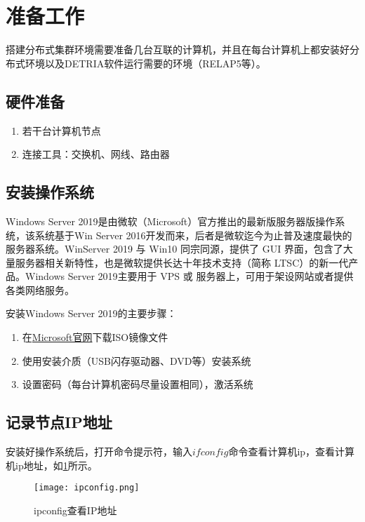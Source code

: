 \section{准备工作}

搭建分布式集群环境需要准备几台互联的计算机，并且在每台计算机上都安装好分布式环境以及DETRIA软件运行需要的环境（RELAP5等）。

\subsection{硬件准备}
\begin{enumerate}
    \item 若干台计算机节点
    \item 连接工具：交换机、网线、路由器
\end{enumerate}

\subsection{安装操作系统}
Windows Server 2019是由微软（Microsoft）官方推出的最新版服务器版操作系统，该系统基于Win Server 2016开发而来，后者是微软迄今为止普及速度最快的服务器系统。WinServer 2019 与 Win10 同宗同源，提供了 GUI 界面，包含了大量服务器相关新特性，也是微软提供长达十年技术支持（简称 LTSC）的新一代产品。Windows Server 2019主要用于 VPS 或 服务器上，可用于架设网站或者提供各类网络服务。

安装Windows Server 2019的主要步骤：
\begin{enumerate}
    \item 在\href{https://www.microsoft.com/en-us/evalcenter/evaluate-windows-server-2019}{Microsoft官网}下载ISO镜像文件
    \item 使用安装介质（USB闪存驱动器、DVD等）安装系统
    \item 设置密码（每台计算机密码尽量设置相同），激活系统
\end{enumerate}

\subsection{记录节点IP地址}
安装好操作系统后，打开命令提示符，输入$ ifconfig $命令查看计算机ip，查看计算机ip地址，如\ref{ipconfig查看IP地址}所示。
\begin{figure}[h]
    \centering
    \texttt{[image: ipconfig.png]}
    \caption{ipconfig查看IP地址}
    \label{ipconfig查看IP地址}
\end{figure}